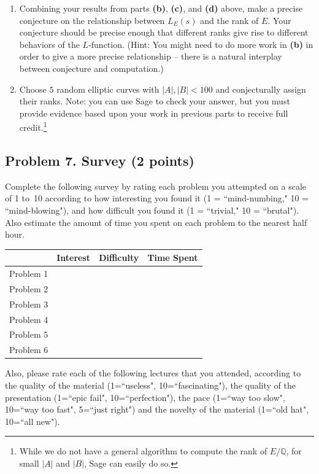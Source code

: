 \documentclass[11pt]{article}
\newcommand{\Q}{\mathbb{Q}}
\theoremstyle{definition}
\begin{document}
\begin{enumerate}[{\bf(a)}]
\item Combining your results from parts \textbf{(b)}, \textbf{(c)}, and \textbf{(d)} above, make a precise conjecture on the relationship between $L_E(s)$ and the rank of $E$. Your conjecture should be precise enough that different ranks give rise to different behaviors of the $L$-function. (Hint: You might need to do more work in \textbf{(b)} in order to give a more precise relationship -- there is a natural interplay between conjecture and computation.)

\item Choose $5$ random elliptic curves with $|A|, |B| < 100$ and conjecturally assign their ranks.  Note: you can use Sage to check your answer, but you must provide evidence based upon your work in previous parts to receive full credit.\footnote{While we do not have a general algorithm to compute the rank of $E/\Q$, for small $|A|$ and $|B|$, Sage can easily do so.}

\end{enumerate}

\subsection*{Problem 7. Survey (2 points)}

Complete the following survey by rating each problem you attempted on a scale of 1 to~10 according to how interesting you found it (1 = ``mind-numbing," 10 = ``mind-blowing"), and how difficult you found it (1 = ``trivial," 10 = ``brutal").  Also estimate the amount of time you spent on each problem to the nearest half hour.

\begin{center}
\begin{tabular}{l|r|r|r|}
& Interest & Difficulty & Time Spent\\\hline
Problem 1 & & & \\\hline
Problem 2 & & & \\\hline
Problem 3 & & & \\\hline
Problem 4 & & & \\\hline
Problem 5 & & & \\\hline
Problem 6 & & & \\\hline
\end{tabular}
\end{center}
\noindent
Also, please rate each of the following lectures that you attended, according to the quality of the material (1=``useless", 10=``fascinating"), the quality of the presentation (1=``epic fail", 10=``perfection"), the pace (1=``way too slow", 10=``way too fast", 5=``just right") and the novelty of the material (1=``old hat", 10=``all new").
\end{document}
